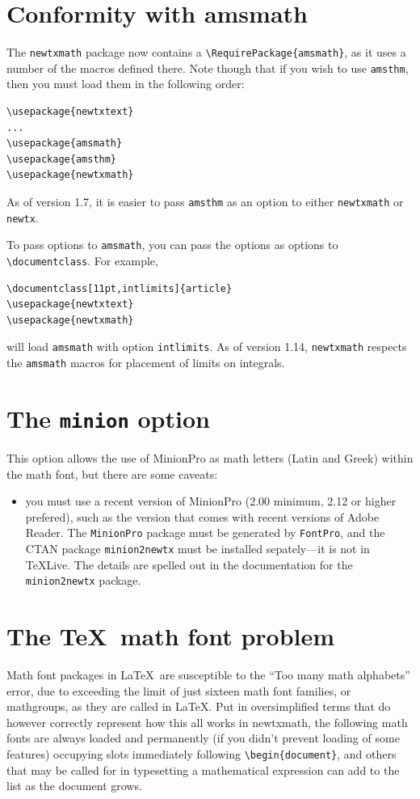 \documentclass[\fsc]{article}
\theoremstyle{oldplain}
\theoremstyle{plain}
\begin{document}
\section{Conformity with amsmath}
The {\tt newtxmath} package now contains a \verb|\RequirePackage{amsmath}|, as it uses a number of the macros defined there. Note though that if you wish to use {\tt amsthm}, then you must load them in the following order:
\begin{verbatim}
\usepackage{newtxtext}
...
\usepackage{amsmath} 
\usepackage{amsthm}
\usepackage{newtxmath}
\end{verbatim}
As of version 1.7, it is easier to pass {\tt amsthm} as an option to either {\tt newtxmath} or {\tt newtx}.

To pass options to {\tt amsmath}, you can pass the options as options to \verb|\documentclass|. For example,
\begin{verbatim}
\documentclass[11pt,intlimits]{article}
\usepackage{newtxtext}
\usepackage{newtxmath}
\end{verbatim}
will load {\tt amsmath} with option {\tt intlimits}. As of version 1.14, {\tt newtxmath} respects the {\tt amsmath} macros for placement of limits on integrals.

\section{The {\tt minion} option}
This option allows the use of MinionPro as math letters (Latin and Greek) within  the math font, but there are some caveats:
\begin{itemize}
\item
you must use a recent version of MinionPro (2.00 minimum, 2.12 or higher prefered), such as the version that comes with recent versions of Adobe Reader. The {\tt MinionPro} package must be generated by {\tt FontPro}, and the CTAN package {\tt minion2newtx} must be installed sepately---it is not in \TeX Live. The details are spelled out in the documentation for the {\tt minion2newtx} package.
\end{itemize}

\section{The \TeX\ math font problem}
Math font packages in \LaTeX\ are susceptible to the ``Too many math alphabets'' error, due to exceeding the limit of just sixteen math font families, or mathgroups, as they are called in \LaTeX. Put in oversimplified terms that do however correctly represent how this all works in \textsf{newtxmath}, the following math fonts are always loaded and permanently (if you didn't prevent loading of some features) occupying slots immediately following \verb|\begin{document}|, and others that may be called for in typesetting a mathematical expression can add to the list as the document grows.
\end{document}
